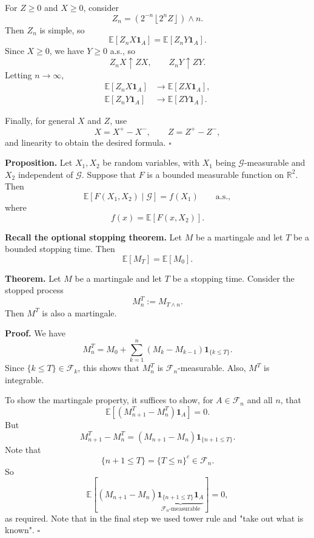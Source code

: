 \documentclass[11pt,a4paper]{article}
\begin{document}
For $Z\geq 0$ and $X\geq 0$, consider
\[
Z_n
=
\left(2^{-n}\left\lfloor 2^n Z\right\rfloor\right)\wedge n.
\]
Then $Z_n$ is simple, so
\[
\mathbb{E}[Z_nX\mathbf{1}_A]
=
\mathbb{E}[Z_nY\mathbf{1}_A].
\]
Since $X\geq 0$, we have $Y\geq 0$ a.s., so
\[
Z_nX\uparrow ZX,
\qquad
Z_nY\uparrow ZY.
\]
Letting $n\to\infty$,
\[
\begin{aligned}
\mathbb{E}[Z_nX\mathbf{1}_A]
&\longrightarrow \mathbb{E}[ZX\mathbf{1}_A],\\
\mathbb{E}[Z_nY\mathbf{1}_A]
&\longrightarrow \mathbb{E}[ZY\mathbf{1}_A].
\end{aligned}
\]

Finally, for general $X$ and $Z$, use
\[
X=X^+-X^-,
\qquad
Z=Z^+-Z^-,
\]
and linearity to obtain the desired formula.
\hfill$\square$

\medskip

\noindent\textbf{Proposition.}
Let $X_1,X_2$ be random variables, with $X_1$ being $\mathcal{G}$-measurable and $X_2$ independent of $\mathcal{G}$. Suppose that $F$ is a bounded measurable function on $\mathbb{R}^2$. Then
\[
\mathbb{E}[F(X_1,X_2)\mid\mathcal{G}]
=
f(X_1)
\qquad \text{a.s.},
\]
where
\[
f(x)=\mathbb{E}[F(x,X_2)].
\]

\medskip

\noindent\textbf{Recall the optional stopping theorem.}
Let $M$ be a martingale and let $T$ be a bounded stopping time. Then
\[
\mathbb{E}[M_T]=\mathbb{E}[M_0].
\]

\medskip

\noindent\textbf{Theorem.}
Let $M$ be a martingale and let $T$ be a stopping time. Consider the stopped process
\[
M_n^T:=M_{T\wedge n}.
\]
Then $M^T$ is also a martingale.

\medskip

\noindent\textbf{Proof.}
We have
\[
M_n^T
=
M_0+\sum_{k=1}^{n}(M_k-M_{k-1})\mathbf{1}_{\{k\leq T\}}.
\]
Since $\{k\leq T\}\in\mathcal{F}_k$, this shows that $M_n^T$ is $\mathcal{F}_n$-measurable. Also, $M^T$ is integrable.

To show the martingale property, it suffices to show, for $A\in\mathcal{F}_n$ and all $n$, that
\[
\mathbb{E}\left[(M_{n+1}^T-M_n^T)\mathbf{1}_A\right]=0.
\]
But
\[
M_{n+1}^T-M_n^T
=
(M_{n+1}-M_n)\mathbf{1}_{\{n+1\leq T\}}.
\]
Note that
\[
\{n+1\leq T\}
=
\{T\leq n\}^{c}
\in\mathcal{F}_n.
\]
So
\[
\mathbb{E}\left[
(M_{n+1}-M_n)
\underbrace{
\mathbf{1}_{\{n+1\leq T\}}\mathbf{1}_A
}_{\mathcal{F}_n\text{-measurable}}
\right]
=0,
\]
as required. Note that in the final step we used tower rule and "take out what is known".
\hfill$\square$
\end{document}

